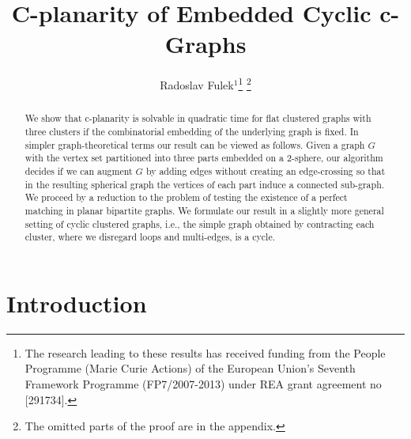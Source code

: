 \documentclass{llncs}
\def\inst#1{$^{#1}$}
\newif\iflong
\begin{document}
\title{C-planarity of Embedded Cyclic c-Graphs}

\author{Radoslav Fulek\inst{1}\thanks{The research leading to these results has received funding from the People Programme (Marie Curie Actions) of the European Union's Seventh Framework Programme (FP7/2007-2013) under REA grant agreement no [291734].}
\iflong\else\thanks{The omitted parts of the proof are in the appendix.}\fi}


\maketitle



\begin{abstract}
We show that c-planarity is solvable in quadratic time for 
flat clustered graphs with three clusters if the combinatorial embedding
of the underlying  graph is fixed. In simpler graph-theoretical terms our result can be viewed as follows. Given a graph $G$ with the vertex set  partitioned into three parts embedded on a 2-sphere, our algorithm decides if we can augment $G$ by adding edges 
without creating an edge-crossing so that in the resulting spherical graph the vertices of each part induce a  connected sub-graph.
We proceed by a reduction to the problem of testing the existence of  a perfect matching in planar
bipartite graphs.
We formulate our result in a slightly more general setting of cyclic clustered graphs,
i.e., the simple graph  obtained by contracting each cluster, where we disregard loops and multi-edges, is a cycle. 
\end{abstract}






\setcounter{page}{1}
\section{Introduction}
\end{document}
